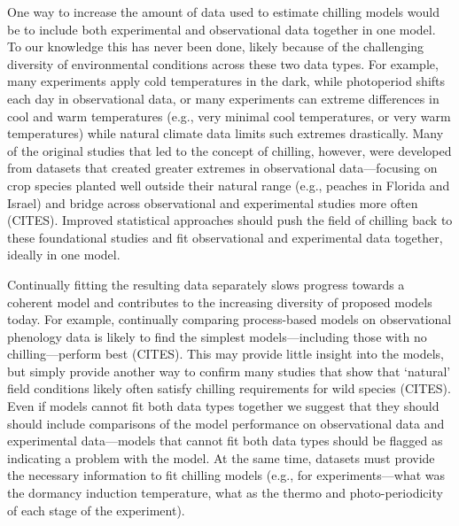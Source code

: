 \documentclass[11pt]{article}
\begin{document}
One way to increase the amount of data used to estimate chilling models would be to include both experimental and observational data together in one model. To our knowledge this has never been done, likely because of the challenging diversity of environmental conditions across these two data types. For example, many experiments apply cold temperatures in the dark, while photoperiod shifts each day in observational data, or many experiments can extreme differences in cool and warm temperatures (e.g., very minimal cool temperatures, or very warm temperatures) while natural climate data limits such extremes drastically. Many of the original studies that led to the concept of chilling, however, were developed from datasets that created greater extremes in observational data---focusing on crop species planted well outside their natural range (e.g., peaches in Florida and Israel) and bridge across observational and experimental studies more often (CITES). Improved statistical approaches should push the field of chilling back to these foundational studies and fit observational and experimental data together, ideally in one model. 

Continually fitting the resulting data separately slows progress towards a coherent model and contributes to the increasing diversity of proposed models today. For example, continually comparing process-based models  on observational phenology data is likely to find the simplest models---including those with no chilling---perform best (CITES). This may provide little insight into the models, but simply provide another way to confirm many studies that show that `natural' field conditions likely often satisfy chilling requirements for wild species (CITES). Even if models cannot fit both data types together we suggest that they should should include comparisons of the model performance on observational data and experimental data---models that cannot fit both data types should be flagged as indicating a problem with the model.  At the same time, datasets must provide the necessary information to fit chilling models (e.g., for experiments---what was the dormancy induction temperature, what as the thermo and photo-periodicity of each stage of the experiment). 
\end{document}
